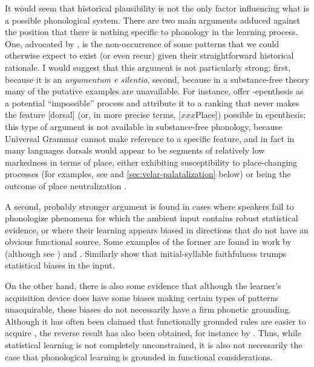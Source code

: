 It would seem that historical plausibility is not the only factor influencing what is a possible phonological system. There are two main arguments adduced against the position that there is nothing specific to phonology in the learning process. One, advocated by \citet{kiparsky08:_univer,hyman08:_univer,lacyng:_synch}, is the non\hyp occurrence of some patterns that we could otherwise expect to exist (or even recur) given their straightforward historical rationale. I would suggest that this argument is not particularly strong: first, because it is an \emph{argumentum e silentio}, second, because in a substance\hyp free theory many of the putative examples are unavailable. For instance, \citet{delacy2006,lacy06:_trans,lacyng:_synch} offer \ipa{[k]}\hyp epenthesis as a potential \enquote{impossible} process and attribute it to a ranking that never makes the feature [dorsal] (or, in more precise terms, [$xxx$Place]) possible in epenthesis; this type of argument is not available in substance\hyp free phonology, because Universal Grammar cannot make reference to a specific feature, and in fact in many languages dorsals would appear to be segments of relatively low markedness in terms of place,  either exhibiting susceptibility to place\hyp changing processes (for examples, see \citealt{rice96:_defaul_variab,rice03:_featur,moren-serbian} and \cref{sec:velar-palatalization} below) or being the outcome of place neutralization \citep[\egm][]{rice07:_marked,ramsammy11:_spanis,ramsammyng:_word_spanis}.

A second, probably stronger argument is found in cases where speakers fail to phonologize phenomena for which the ambient input contains robust statistical evidence, or where their learning appears biased in directions that do not have an obvious functional source. Some examples of the former are found in work by \citet{moreton06:_analy} (although see \citealt{yu11}) and \citet{becker09:_phonol,becker11:_surfeit_stimul}. Similarly \citet{beckerng:_asymm_gener_alter_initial_syllab} show that initial\hyp syllable faithfulness trumps statistical biases in the input.

On the other hand, there is also some evidence that although the learner's acquisition device does have some biases making certain types of patterns unacquirable, these biases do not necessarily have a firm phonetic grounding. Although it has often been claimed that functionally grounded rules are easier to acquire \citep[\egm][]{demuth95:_marked,jusczyk02:_how_englis_learn_infan_respon}, the reverse result has also been obtained, for instance by \citet{seidl05}. Thus, while statistical learning is not completely unconstrained, it is also not necessarily the case that phonological learning is grounded in functional considerations.

